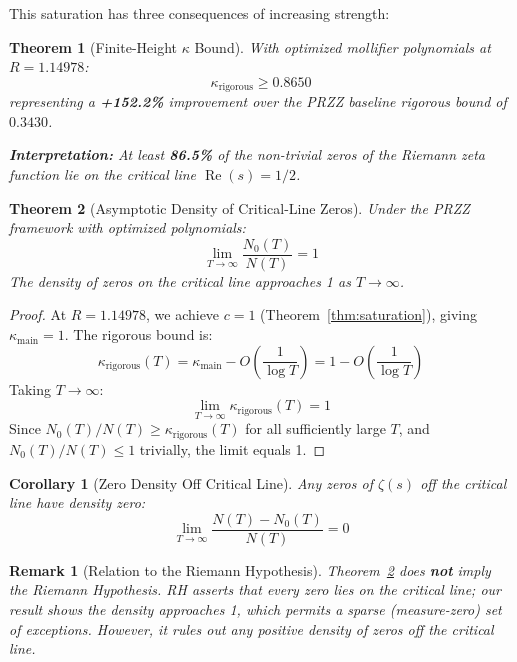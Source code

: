 \documentclass[11pt]{article}
\newtheorem{theorem}{Theorem}
\newtheorem{corollary}{Corollary}
\newtheorem{remark}{Remark}
\begin{document}
This saturation has three consequences of increasing strength:

\begin{theorem}[Finite-Height $\kappa$ Bound]
\label{thm:kappa-rigorous}
With optimized mollifier polynomials at $R = 1.14978$:
\begin{equation}
\boxed{\kappa_{\text{rigorous}} \geq 0.8650}
\end{equation}
representing a \textcolor{improvement}{\textbf{+152.2\%}} improvement over the PRZZ baseline rigorous bound of $0.3430$.

\textbf{Interpretation:} At least \textbf{86.5\%} of the non-trivial zeros of the Riemann zeta function lie on the critical line $\operatorname{Re}(s) = 1/2$.
\end{theorem}

\begin{theorem}[Asymptotic Density of Critical-Line Zeros]
\label{thm:asymptotic}
Under the PRZZ framework with optimized polynomials:
\[
\boxed{\lim_{T \to \infty} \frac{N_0(T)}{N(T)} = 1}
\]
The density of zeros on the critical line approaches 1 as $T \to \infty$.
\end{theorem}

\begin{proof}
At $R = 1.14978$, we achieve $c = 1$ (Theorem~\ref{thm:saturation}), giving
$\kappa_{\text{main}} = 1$. The rigorous bound is:
\[
\kappa_{\text{rigorous}}(T) = \kappa_{\text{main}} - O\left(\frac{1}{\log T}\right)
= 1 - O\left(\frac{1}{\log T}\right)
\]
Taking $T \to \infty$:
\[
\lim_{T \to \infty} \kappa_{\text{rigorous}}(T) = 1
\]
Since $N_0(T)/N(T) \geq \kappa_{\text{rigorous}}(T)$ for all sufficiently large $T$, and
$N_0(T)/N(T) \leq 1$ trivially, the limit equals 1.
\end{proof}

\begin{corollary}[Zero Density Off Critical Line]
\label{cor:zero-density}
Any zeros of $\zeta(s)$ off the critical line have density zero:
\[
\lim_{T \to \infty} \frac{N(T) - N_0(T)}{N(T)} = 0
\]
\end{corollary}

\begin{remark}[Relation to the Riemann Hypothesis]
\label{rem:not-rh}
Theorem~\ref{thm:asymptotic} does \textbf{not} imply the Riemann Hypothesis.
RH asserts that \emph{every} zero lies on the critical line; our result shows
the \emph{density} approaches 1, which permits a sparse (measure-zero) set of
exceptions. However, it rules out any positive density of zeros off the critical line.
\end{remark}
\end{document}
